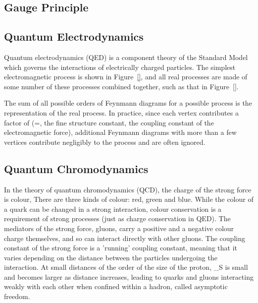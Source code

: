 \subsection{Gauge Principle}
\label{ss:gauge_principle}

\subsection{Quantum Electrodynamics}
\label{ss:quantum_chromodynamics}

Quantum electrodynamics (QED) is a component theory of the Standard Model which governs the interactions of
electrically charged particles. The simplest electromagnetic process is shown in Figure~\ref{}, and all real
processes are made of some number of these processes combined together, such as that in Figure~\ref{}.

The sum of all possible orders of Feynmann diagrams for a possible process is the representation of the real
process. In practice, since each vertex contributes a factor of \alpha (=, the fine structure
constant, the coupling constant of the electromagnetic force), additional Feynmann diagrams with more than a
few vertices contribute negligibly to the process and are often ignored.

\subsection{Quantum Chromodynamics}
\label{ss:quantum_chromodynamics}

In the theory of quantum chromodynamics (QCD), the charge of the strong force is colour, There are three kinds
of colour: red, green and blue. While the colour of a quark can be changed in a strong interaction, colour
conservation is a requirement of strong processes (just as charge conservation in QED). The mediators of
the strong force, gluons, carry a positive and a negative colour charge themselves, and so can interact
directly with other gluons. The coupling constant of the strong force is a 'running' coupling constant,
meaning that it varies depending on the distance between the particles undergoing the interaction. At small
distances of the order of the size of the proton, \alpha_{S} is small and becomes larger as distance
increases, leading to quarks and gluons interacting weakly with each other when confined within a
hadron, called asymptotic freedom. 

